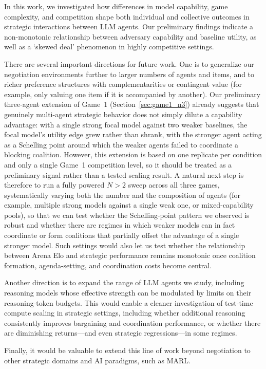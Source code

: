 In this work, we investigated how differences in model capability, game complexity, and competition shape both individual and collective outcomes in strategic interactions between LLM agents.
Our preliminary findings indicate a non-monotonic relationship between adversary capability and baseline utility, as well as a `skewed deal' phenomenon in highly competitive settings.

There are several important directions for future work.
One is to generalize our negotiation environments further to larger numbers of agents and items, and to richer preference structures with complementarities or contingent value (for example, only valuing one item if it is accompanied by another).
Our preliminary three-agent extension of Game~1 (Section~\ref{sec:game1_n3}) already suggests that genuinely multi-agent strategic behavior does not simply dilute a capability advantage: with a single strong focal model against two weaker baselines, the focal model's utility edge grew rather than shrank, with the stronger agent acting as a Schelling point around which the weaker agents failed to coordinate a blocking coalition.
However, this extension is based on one replicate per condition and only a single Game~1 competition level, so it should be treated as a preliminary signal rather than a tested scaling result.
A natural next step is therefore to run a fully powered $N > 2$ sweep across all three games, systematically varying both the number and the composition of agents (for example, multiple strong models against a single weak one, or mixed-capability pools), so that we can test whether the Schelling-point pattern we observed is robust and whether there are regimes in which weaker models can in fact coordinate or form coalitions that partially offset the advantage of a single stronger model.
Such settings would also let us test whether the relationship between Arena Elo and strategic performance remains monotonic once coalition formation, agenda-setting, and coordination costs become central.

Another direction is to expand the range of LLM agents we study, including reasoning models whose effective strength can be modulated by limits on their reasoning-token budgets.
This would enable a cleaner investigation of test-time compute scaling in strategic settings, including whether additional reasoning consistently improves bargaining and coordination performance, or whether there are diminishing returns---and even strategic regressions---in some regimes.

Finally, it would be valuable to extend this line of work beyond negotiation to other strategic domains and AI paradigms, such as MARL.
